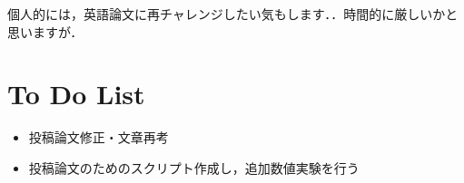 \documentclass[11pt]{jsarticle}
\begin{document}
			個人的には，英語論文に再チャレンジしたい気もします．．時間的に厳しいかと思いますが．
	\section{To Do List}
		\begin{itemize}
			\item 投稿論文修正・文章再考
			\item 投稿論文のためのスクリプト作成し，追加数値実験を行う
		\end{itemize}
				
	\newpage
\vspace{10cm}
	

\vspace{14cm}
	\articleSPRfour
	\articleSPRfive
\end{document}
